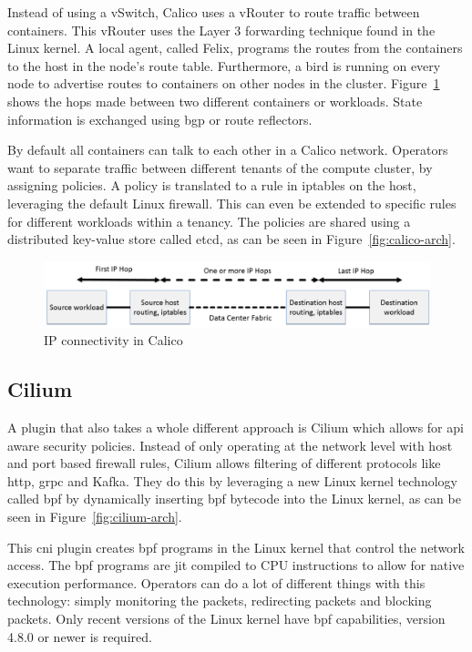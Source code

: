 Instead of using a vSwitch, Calico uses a vRouter to route traffic between containers. This vRouter uses the Layer 3 forwarding technique found in the Linux kernel. A local agent, called Felix, programs the routes from the containers to the host in the node's route table. Furthermore, a \gls{bird} is running on every node to advertise routes to containers on other nodes in the cluster. Figure~\ref{fig:hops} shows the hops made between two different containers or workloads. State information is exchanged using \gls{bgp} or route reflectors.

By default all containers can talk to each other in a Calico network. Operators want to separate traffic between different tenants of the compute cluster, by assigning policies. A policy is translated to a rule in iptables\cite{iptables} on the host, leveraging the default Linux firewall. This can even be extended to specific rules for different workloads within a tenancy. The policies are shared using a distributed key-value store called etcd\cite{etcd}, as can be seen in Figure~\ref{fig:calico-arch}.

\begin{figure}
    \centering
    \includegraphics[width=1\columnwidth]{images/calico-hops}
    \caption{IP connectivity in Calico\cite{calico_learn}}
    \label{fig:hops}
\end{figure}

\subsection{Cilium}
\label{subsec:cilium}
A plugin that also takes a whole different approach is Cilium\cite{cilium} which allows for \gls{api} aware security policies. Instead of only operating at the network level with host and port based firewall rules, Cilium allows filtering of different protocols like \gls{http}, \gls{grpc}\cite{grpc} and Kafka\cite{kafka}. They do this by leveraging a new Linux kernel technology called \gls{bpf}\cite{mccanne1993bsd, cilium_bpf} by dynamically inserting \gls{bpf} bytecode into the Linux kernel, as can be seen in Figure~\ref{fig:cilium-arch}. 

This \gls{cni} plugin creates \gls{bpf} programs in the Linux kernel that control the network access. The \gls{bpf} programs are \gls{jit} compiled to CPU instructions to allow for native execution performance. Operators can do a lot of different things with this technology: simply monitoring the packets, redirecting packets and blocking packets. Only recent versions of the Linux kernel have \gls{bpf} capabilities, version 4.8.0 or newer is required. 

